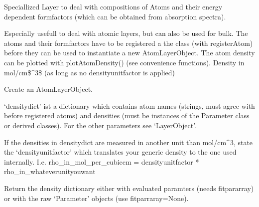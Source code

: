 \documentclass[letterpaper,10pt,english]{sphinxmanual}
\begin{document}

\begin{fulllineitems}
\label{\detokenize{modules-api/samplerepresentation:SampleRepresentation.AtomLayerObject}}
Speciallized Layer to deal with compositions of Atoms and their energy dependent formfactors (which can be obtained from absorption spectra).

Especially usefull to deal with atomic layers, but can also be used for bulk.
The atoms and their formfactors have to be registered a the class (with registerAtom) before they can be used to instantiate a new AtomLayerObject.
The atom density can be plotted with plotAtomDensity() (see convenience functions).
Density in mol/cm\$\textasciicircum{}3\$ (as long as no densityunitfactor is applied)

\begin{fulllineitems}
\label{\detokenize{modules-api/samplerepresentation:SampleRepresentation.AtomLayerObject.__init__}}
Create an AtomLayerObject.

‘densitydict’ ist a dictionary which contains atom names (strings, must agree with before registered atoms) and densities (must be instances of the Parameter class or derived classes).
For the other parameters see ‘LayerObject’.

If the densities in densitydict are measured in another unit than mol/cm\textasciicircum{}3, state the ‘densityunitfactor’ which translates your generic density to the one used internally.
I.e.    rho\_in\_mol\_per\_cubiccm = densityunitfactor * rho\_in\_whateverunityouwant

\end{fulllineitems}


\begin{fulllineitems}
\label{\detokenize{modules-api/samplerepresentation:SampleRepresentation.AtomLayerObject.getDensitydict}}
Return the density dictionary either with evaluated paramters (needs fitpararray) or with the raw ‘Parameter’ objects (use fitparraray=None).


\end{fulllineitems}
\end{fulllineitems}
\end{document}

